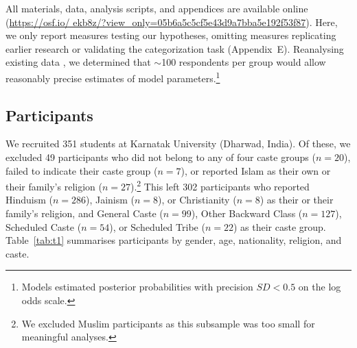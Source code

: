 \documentclass[12pt, a4paper]{article}
\begin{document}
All materials, data, analysis scripts, and appendices are available online (\href{https://osf.io/ekb8z/?view_only=05b6a5c5cf5e43d9a7bba5e192f53f87}{https://osf.io/ ekb8z/?view\_only=05b6a5c5cf5e43d9a7bba5e192f53f87}). Here, we only report measures testing our hypotheses, omitting measures replicating earlier research or validating the categorization task (Appendix~E). Reanalysing existing data \cite{dommelen_construing_2015}, we determined that $\sim$100 respondents per group would allow reasonably precise estimates of model parameters.\footnote{Models estimated posterior probabilities with precision $\textit{SD} < 0.5$ on the log odds scale.}

\subsection{Participants}

We recruited 351 students at Karnatak University (Dharwad, India). Of these, we excluded 49 participants who did not belong to any of four caste groups ($n = 20$), failed to indicate their caste group ($n = 7$), or reported Islam as their own or their family's religion ($n = 27$).\footnote{We excluded Muslim participants as this subsample was too small for meaningful analyses.} This left 302 participants who reported Hinduism ($n = 286$), Jainism ($n = 8$), or Christianity ($n = 8$) as their or their family's religion, and General Caste ($n = 99$), Other Backward Class ($n = 127$), Scheduled Caste ($n = 54$), or Scheduled Tribe ($n = 22$) as their caste group. Table~\ref{tab:t1} summarises participants by gender, age, nationality, religion, and caste.
\end{document}
